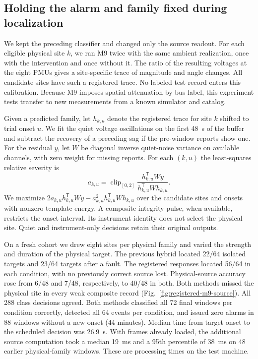 \subsection{Holding the alarm and family fixed during localization}
We kept the preceding classifier and changed only the source readout.
For each eligible physical site $k$, we ran M9 twice with the same
ambient realization, once with the intervention and once without it.
The ratio of the resulting voltages at the eight PMUs gives a
site-specific trace of magnitude and angle changes. All candidate
sites have such a registered trace. No labeled test record enters
this calibration. Because M9 imposes spatial attenuation by bus label,
this experiment tests transfer to new measurements from a known
simulator and catalog.

Given a predicted family, let $h_{k,u}$ denote the registered trace
for site $k$ shifted to trial onset $u$. We fit the quiet voltage
oscillations on the first 48~s of the buffer and subtract the recovery
of a preceding sag if the pre-window reports show one. For the residual
$y$, let $W$ be diagonal inverse quiet-noise variance on available
channels, with zero weight for missing reports. For each $(k,u)$ the
least-squares relative severity is
\begin{equation}
 a_{k,u}=\operatorname{clip}_{[0,2]}
 \frac{h_{k,u}^{\mathsf T}Wy}{h_{k,u}^{\mathsf T}Wh_{k,u}} .
\end{equation}
We maximize $2a_{k,u}h_{k,u}^{\mathsf T}Wy-
a_{k,u}^2 h_{k,u}^{\mathsf T}Wh_{k,u}$ over the candidate sites and
onsets with nonzero template energy. A composite integrity pulse,
when available, restricts the onset interval. Its instrument identity
does not select the physical site. Quiet and instrument-only decisions
retain their original outputs.

On a fresh cohort we drew eight sites per physical family and varied
the strength and duration of the physical target. The previous hybrid
located 22/64 isolated targets and 23/64 targets after a fault. The
registered responses located 56/64 in each condition, with no previously
correct source lost. Physical-source accuracy rose from 6/48 and 7/48,
respectively, to 40/48 in both. Both methods missed the physical site
in every weak composite record (Fig.~\ref{fig:registered-m9-source}).
All 288 class decisions agreed. Both methods classified all 72 final
windows per condition correctly, detected all 64 events per condition,
and issued zero alarms in 88 windows without a new onset (44 minutes).
Median time from target onset to the scheduled decision was 26.9~s.
With frames already loaded, the additional source computation took a
median 19~ms and a 95th percentile of 38~ms on 48 earlier physical-family
windows. These are processing times on the test machine.

